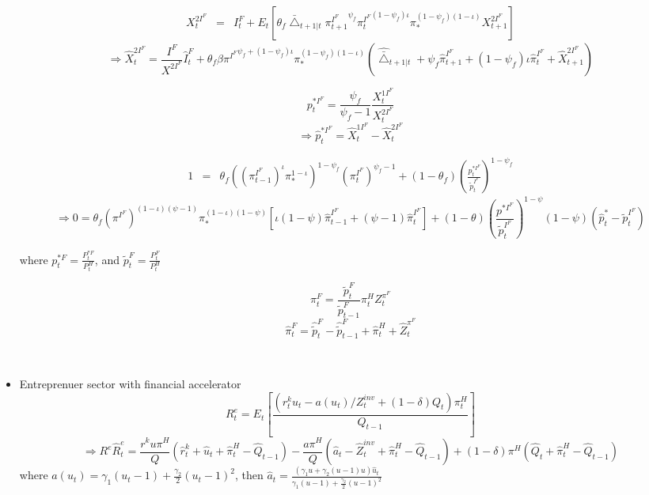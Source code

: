 \documentclass[11pt, a4paper]{article}
\begin{document}
\begin{itemize}
\begin{eqnarray*} X_t^{2I^F} &=&  I_t^F + E_t \left[\theta_f \bar{\bigtriangleup}_{t+1|t}  {\pi_{t+1}^{I^F}}^{\psi_f} {\pi_{t}^{I^F}}^{(1-\psi_f)\iota} \pi_*^{(1-\psi_f)(1-\iota) } X_{t+1}^{2I^F} \right]
\end{eqnarray*} 
\begin{equation}\Rightarrow \widehat{X}_t^{2I^F} =  \frac{ I^F} {X^{2I^F}} \widehat{I}_t^F + \theta_f \beta {\pi^{I^F}}^{\psi_f+(1-\psi_f)\iota} \pi_*^{(1-\psi_f)(1-\iota)} \left(\widehat{\bar{\bigtriangleup}}_{t+1|t} + \psi_f\widehat{\pi}_{t+1}^{I^F} + (1-\psi_f)\iota \widehat{\pi}_t^{I^F} + \widehat{X}_{t+1}^{2I^F }\right)\end{equation}

\[p_t^{*I^F} = \frac{\psi_f}{\psi_f-1} \frac{X_t^{1I^F}}{X_t^{2I^F}} \]
\begin{equation} \Rightarrow \widehat{p}_t^{*I^F} = \widehat{X}_t^{1I^F} - \widehat{X}_t^{2I^F}\end{equation}

\begin{eqnarray*}
1 &=&  {\theta_f} {\left({(\pi_{t-1}^{I^F})}^{\iota} \pi_*^{1-\iota}\right)}^{1-\psi_f} {(\pi_t^{I^F})}^{\psi_f-1}  + (1-\theta_f)  \left({\frac{p_t^{*I^F}} {\tilde{p}_t^{I^F}}}\right)^{1-\psi_f}
\end{eqnarray*} 
\begin{equation} \Rightarrow 0 = {\theta_f} {{(\pi^{I^F})}^{(1-\iota)(\psi -1)}\pi_*^{(1-\iota)(1-\psi)}} \left[\iota(1-\psi)\widehat{\pi}_{t-1}^{I^F} + (\psi-1) \widehat{\pi}_{t}^{I^F}\right]  + (1-\theta)  \left(\frac{{p^{*I^F}}}{\tilde{p}_t^{I^F}}\right)^{1-\psi}(1-\psi)\left(\widehat{p}_t^* - \tilde{p}_t^{I^F}\right)\end{equation}

where  ${p}_t^{*F} = \frac{P_t^{*F}}{P_t^H}$, and  $\tilde{p}_t^F = \frac{P_t^F}{P_t^H}$

\[ \pi_t^F = \frac{\tilde{p}_t^{F}} {\tilde{p}_{t-1}^{F}} \pi_t^H Z_t^{\pi^F}\]
\begin{equation}
\widehat{\pi}_t^F = \widehat{\tilde{p}}_t^{F} -\widehat{\tilde{p}}_{t-1}^{F} + \widehat{\pi}_t^H + \widehat{Z}_t^{\pi^F}
\end{equation}
\par

~\\
\item Entreprenuer sector with financial accelerator
\[ R_t^e = E_t \left[\frac{(r_{t}^k u_{t} - a(u_{t})/Z_{t}^{inv}+ (1-\delta)Q_{t})\pi_t^H}{Q_{t-1}} \right]
\] \begin{equation}
\Rightarrow R^e\widehat{R}_t^e =  \frac{r^k u \pi^H}{Q}(\widehat{r}_t^k + \widehat{u}_t + \widehat{\pi}_t^H - \widehat{Q}_{t-1}) - \frac{a \pi^H}{Q}(\widehat{a}_t -\widehat{Z}_t^{inv} + \widehat{\pi}_t^H - \widehat{Q}_{t-1} ) + (1-\delta)\pi^H(\widehat{Q}_t + \widehat{\pi}_t^H - \widehat{Q}_{t-1}) \end{equation}
  where $a(u_t)= \gamma_1(u_t -1) + \frac{\gamma_2}{2}(u_t -1)^2$, then $\widehat{a}_t = \frac{(\gamma_1u + \gamma_2 (u-1)u)\widehat{u}_t}{\gamma_1(u-1) + \frac{\gamma_2}{2}(u-1)^2}  $ 
  

\end{itemize}
\end{document}
